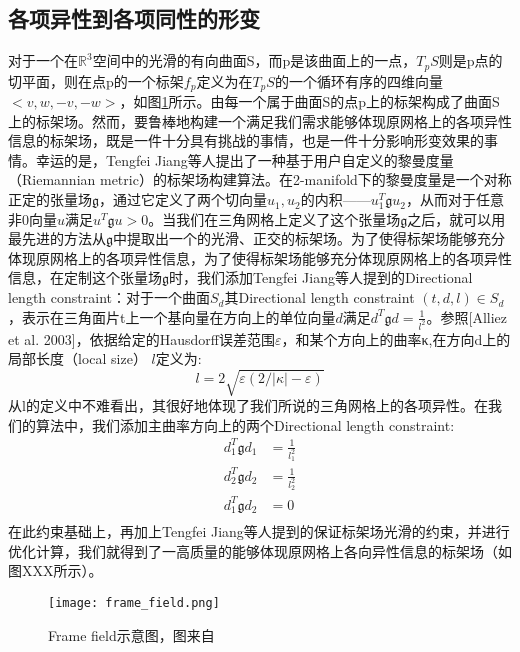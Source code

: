 \subsection{各项异性到各项同性的形变}
对于一个在$\mathbb{R}^3$空间中的光滑的有向曲面S，而p是该曲面上的一点，$T_pS$则是p点的切平面，则在点p的一个标架$f_p$定义为在$T_pS$的一个循环有序的四维向量$<v,w,−v,−w>$，如图\ref{fig:frame-field}所示。由每一个属于曲面S的点p上的标架构成了曲面S上的标架场。然而，要鲁棒地构建一个满足我们需求能够体现原网格上的各项异性信息的标架场，既是一件十分具有挑战的事情，也是一件十分影响形变效果的事情。幸运的是，Tengfei Jiang等人提出了一种基于用户自定义的黎曼度量（Riemannian metric）的标架场构建算法。在2-manifold下的黎曼度量是一个对称正定的张量场$\mathfrak{g}$，通过它定义了两个切向量$u_1, u_2$的内积——$u_1^T \mathfrak{g} u_2$，从而对于任意非0向量$u$满足$u^T \mathfrak{g} u>0$。当我们在三角网格上定义了这个张量场$\mathfrak{g}$之后，就可以用最先进的方法从$\mathfrak{g}$中提取出一个的光滑、正交的标架场。为了使得标架场能够充分体现原网格上的各项异性信息，为了使得标架场能够充分体现原网格上的各项异性信息，在定制这个张量场$\mathfrak{g}$时，我们添加Tengfei Jiang等人提到的Directional length constraint：对于一个曲面$S_d$其Directional length constraint $(t, d, l) \in S_d$，表示在三角面片t上一个基向量在方向上的单位向量$d$满足$d^T \mathfrak{g} d = \frac{1}{l^2}$。参照[Alliez et al. 2003]，依据给定的Hausdorff误差范围$\varepsilon$，和某个方向上的曲率κ,在方向d上的局部长度（local size） $l$定义为:
\begin{equation}
  l = 2 \sqrt{\varepsilon(2/|\kappa| - \varepsilon)}
\end{equation}
从l的定义中不难看出，其很好地体现了我们所说的三角网格上的各项异性。在我们的算法中，我们添加主曲率方向上的两个Directional length constraint:
\begin{equation}
  \begin{split}
    d_1^T \mathfrak{g} d_1 &= \frac{1}{l_1^2}\\
    d_2^T \mathfrak{g} d_2 &= \frac{1}{l_2^2}\\
    d_1^T \mathfrak{g} d_2 &= 0\\
  \end{split}
\end{equation}
在此约束基础上，再加上Tengfei Jiang等人提到的保证标架场光滑的约束，并进行优化计算，我们就得到了一高质量的能够体现原网格上各向异性信息的标架场（如图XXX所示）。\par
\begin{figure}[htbp]
    \centering
    \texttt{[image: frame\_field.png]}
    \caption{Frame field示意图，图来自\cite{isotopic-appro}}
    \label{fig:frame-field}
\end{figure}
